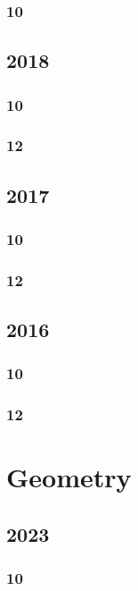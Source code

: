 \documentclass[11pt]{book}
\begin{document}
\subsection{10}

\section{2018} 
\subsection{10}

\subsection{12}




\section{2017}
\subsection{10}

\subsection{12}




\section{2016}
\subsection{10}

\subsection{12}






\chapter{Geometry}
\section{2023}
\subsection{10}


\end{document}
